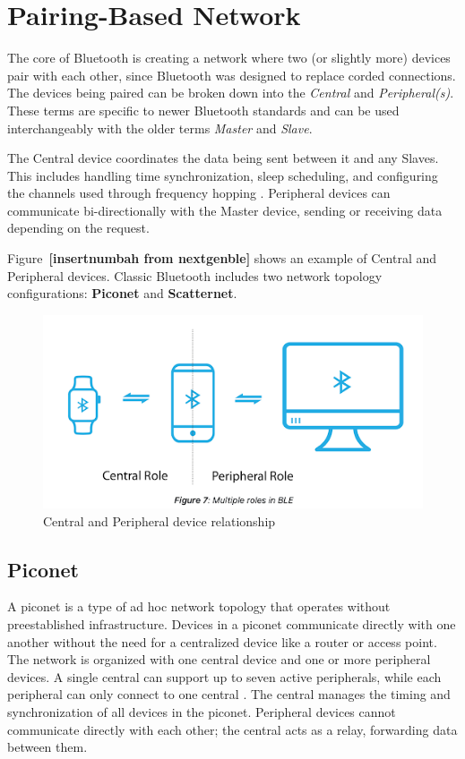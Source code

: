 \section{Pairing-Based Network}

The core of Bluetooth is creating a network where two (or slightly more) devices pair with each other, since Bluetooth was designed to replace corded connections. The devices being paired can be broken down into the \textit{Central} and \textit{Peripheral(s)}. These terms are specific to newer Bluetooth standards and can be used interchangeably with the older terms \textit{Master} and \textit{Slave}.

The Central device coordinates the data being sent between it and any Slaves. This includes handling time synchronization, sleep scheduling, and configuring the channels used through frequency hopping \cite{nextgenBLE}. Peripheral devices can communicate bi-directionally with the Master device, sending or receiving data depending on the request.

Figure~\textbf{[insertnumbah from nextgenble]} shows an example of Central and Peripheral devices. Classic Bluetooth includes two network topology configurations: \textbf{Piconet} and \textbf{Scatternet}.

\begin{figure}[h]
    \caption{Central and Peripheral device relationship}
    \includegraphics{centralperipheral.png}
    \end{figure}

\subsection{Piconet}

A piconet is a type of ad hoc network topology that operates without preestablished infrastructure. Devices in a piconet communicate directly with one another without the need for a centralized device like a router or access point. The network is organized with one central device and one or more peripheral devices. A single central can support up to seven active peripherals, while each peripheral can only connect to one central \cite{nextgenBLE}. The central manages the timing and synchronization of all devices in the piconet. Peripheral devices cannot communicate directly with each other; the central acts as a relay, forwarding data between them.

